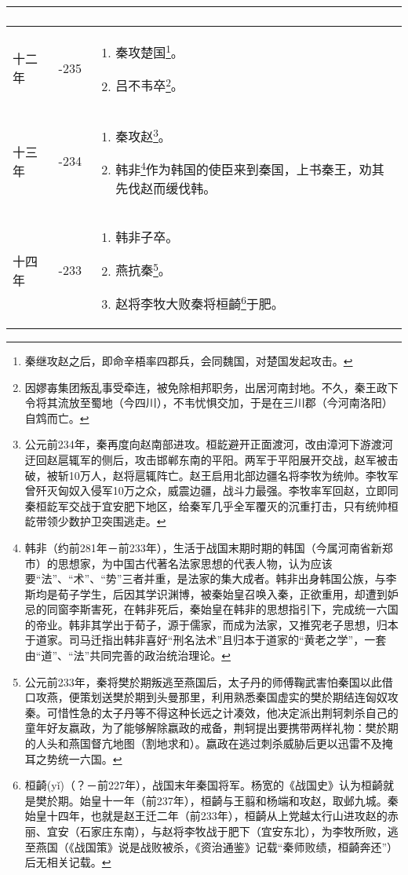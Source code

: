 \begin{longtable}{|>{\centering\scriptsize}m{2em}|>{\centering\scriptsize}m{1.3em}|>{\centering}m{9em}|}
\begin{enumerate}
  \end{enumerate} \tabularnewline\hline
  十二年 & -235 & \begin{enumerate}
    \tiny
  \item 秦攻楚国\footnote{秦继攻赵之后，即命辛梧率四郡兵，会同魏国，对楚国发起攻击。}。
  \item 吕不韦卒\footnote{因嫪毐集团叛乱事受牵连，被免除相邦职务，出居河南封地。不久，秦王政下令将其流放至蜀地（今四川），不韦忧惧交加，于是在三川郡（今河南洛阳）自鸩而亡。}。
  \end{enumerate} \tabularnewline\hline
  十三年 & -234 & \begin{enumerate}
    \tiny
  \item 秦攻赵\footnote{公元前234年，秦再度向赵南部进攻。桓龁避开正面渡河，改由漳河下游渡河迂回赵扈辄军的侧后，攻击邯郸东南的平阳。两军于平阳展开交战，赵军被击破，被斩10万人，赵将扈辄阵亡。赵王启用北部边疆名将李牧为统帅。李牧军曾歼灭匈奴入侵军10万之众，威震边疆，战斗力最强。李牧率军回赵，立即同秦桓龁军交战于宜安肥下地区，给秦军几乎全军覆灭的沉重打击，只有统帅桓龁带领少数护卫突围逃走。}。
  \item 韩非\footnote{韩非（约前281年－前233年），生活于战国末期时期的韩国（今属河南省新郑市）的思想家，为中国古代著名法家思想的代表人物，认为应该要“法”、“术”、“势”三者并重，是法家的集大成者。韩非出身韩国公族，与李斯均是荀子学生，后因其学识渊博，被秦始皇召唤入秦，正欲重用，却遭到妒忌的同窗李斯害死，在韩非死后，秦始皇在韩非的思想指引下，完成统一六国的帝业。韩非其学出于荀子，源于儒家，而成为法家，又推究老子思想，归本于道家。司马迁指出韩非喜好“刑名法术”且归本于道家的“黄老之学”，一套由“道”、“法”共同完善的政治统治理论。}作为韩国的使臣来到秦国，上书秦王，劝其先伐赵而缓伐韩。
  \end{enumerate} \tabularnewline\hline
  十四年 & -233 & \begin{enumerate}
    \tiny
  \item 韩非子卒。
  \item 燕抗秦\footnote{公元前233年，秦将樊於期叛逃至燕国后，太子丹的师傅鞠武害怕秦国以此借口攻燕，便策划送樊於期到头曼那里，利用熟悉秦国虚实的樊於期结连匈奴攻秦。可惜性急的太子丹等不得这种长远之计凑效，他决定派出荆轲刺杀自己的童年好友嬴政，为了能够解除嬴政的戒备，荆轲提出要携带两样礼物：樊於期的人头和燕国督亢地图（割地求和）。嬴政在逃过刺杀威胁后更以迅雷不及掩耳之势统一六国。}。
  \item 赵将李牧大败秦将桓齮\footnote{桓齮(yǐ)（？－前227年），战国末年秦国将军。杨宽的《战国史》认为桓齮就是樊於期。始皇十一年（前237年），桓齮与王翦和杨端和攻赵，取邺九城。秦始皇十四年，也就是赵王迁二年（前233年），桓齮从上党越太行山进攻赵的赤丽、宜安（石家庄东南），与赵将李牧战于肥下（宜安东北），为李牧所败，逃至燕国（《战国策》说是战败被杀，《资治通鉴》记载“秦师败绩，桓齮奔还”）后无相关记载。}于肥。

\end{enumerate}
\end{longtable}
